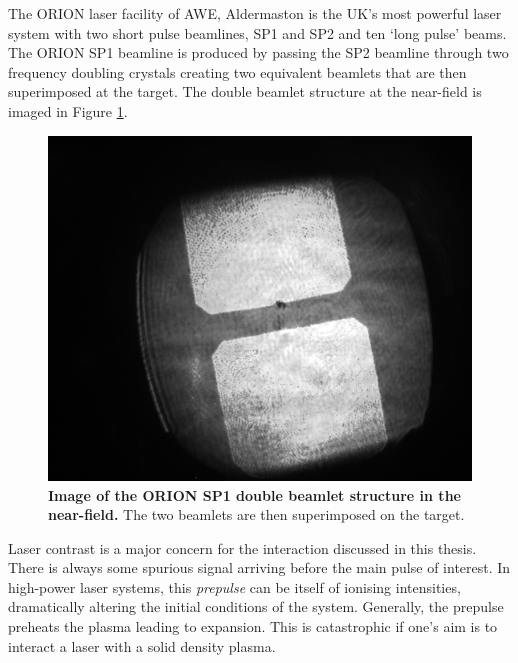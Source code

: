 The ORION laser facility of AWE, Aldermaston is the UK's most powerful laser system with two short pulse beamlines, SP1 and SP2 and ten `long pulse' beams. The ORION SP1 beamline is produced by passing the SP2 beamline through two frequency doubling crystals creating two equivalent beamlets that are then superimposed at the target. The double beamlet structure at the near-field is imaged in Figure \ref{fig:oriondoublebeamletsnearfield}.
\begin{figure}
	\centering
	\includegraphics[width=0.5\linewidth]{figures/orion/orion_doublebeamlets_near_field}
	\caption[Image of the ORION SP1 double beamlet structure in the near-field.]{\textbf{Image of the ORION SP1 double beamlet structure in the near-field.} The two beamlets are then superimposed on the target.}
	\label{fig:oriondoublebeamletsnearfield}
\end{figure}

Laser contrast is a major concern for the interaction discussed in this thesis. There is always some spurious signal arriving before the main pulse of interest. In high-power laser systems, this \textit{prepulse} can be itself of ionising intensities, dramatically altering the initial conditions of the system. Generally, the prepulse preheats the plasma leading to expansion. This is catastrophic if one's aim is to interact a laser with a solid density plasma.

